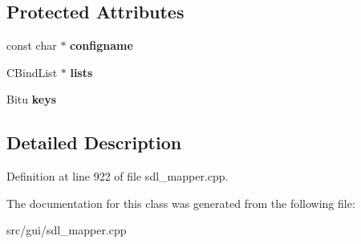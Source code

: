 \subsection*{Protected Attributes}
\begin{DoxyCompactItemize}
\item 
\hypertarget{classCKeyBindGroup_a7202ea1d9a5efdcda4f277d03e63ad63}{const char $\ast$ {\bfseries configname}}\label{classCKeyBindGroup_a7202ea1d9a5efdcda4f277d03e63ad63}

\item 
\hypertarget{classCKeyBindGroup_a915bc22f23540b1f8924adc831ba86ee}{C\-Bind\-List $\ast$ {\bfseries lists}}\label{classCKeyBindGroup_a915bc22f23540b1f8924adc831ba86ee}

\item 
\hypertarget{classCKeyBindGroup_a0d64ae014dfbdc463fea363dccd1bda6}{Bitu {\bfseries keys}}\label{classCKeyBindGroup_a0d64ae014dfbdc463fea363dccd1bda6}

\end{DoxyCompactItemize}


\subsection{Detailed Description}


Definition at line 922 of file sdl\-\_\-mapper.\-cpp.



The documentation for this class was generated from the following file\-:\begin{DoxyCompactItemize}
\item 
src/gui/sdl\-\_\-mapper.\-cpp\end{DoxyCompactItemize}
